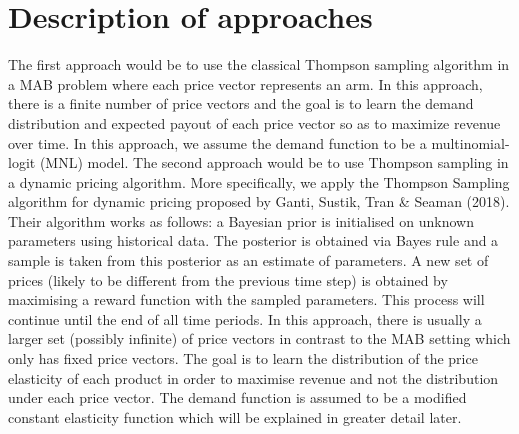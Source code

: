 \documentclass[a4paper]{article}
\begin{document}
\section{Description of approaches}
\label{sec:approach}
The first approach would be to use the classical Thompson sampling algorithm in a MAB problem where each price vector represents an arm. In this approach, there is a finite number of price vectors and the goal is to learn the demand distribution and expected payout of each price vector so as to maximize revenue over time. In this approach, we assume the demand function to be a multinomial-logit (MNL) model.
\newline
\newline
The second approach would be to use Thompson sampling in a dynamic pricing algorithm. More specifically, we apply the Thompson Sampling algorithm for dynamic pricing proposed by Ganti, Sustik, Tran \& Seaman (2018). Their algorithm works as follows: a Bayesian prior is initialised on unknown parameters using historical data. The posterior is obtained via Bayes rule and a sample is taken from this posterior as an estimate of parameters. A new set of prices (likely to be different from the previous time step) is obtained by maximising a reward function with the sampled parameters. This process will continue until the end of all time periods. In this approach, there is usually a larger set (possibly infinite) of price vectors in contrast to the MAB setting which only has fixed price vectors. The goal is to learn the distribution of the price elasticity of each product in order to maximise revenue and not the distribution under each price vector. The demand function is assumed to be a modified constant elasticity function which will be explained in greater detail later.
\end{document}
